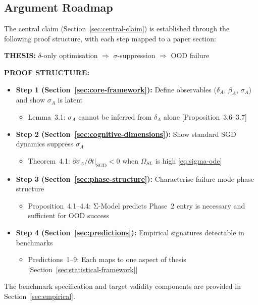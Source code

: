 \documentclass[10pt]{article}
\begin{document}
\subsection{Argument Roadmap}\label{sec:argument-roadmap}

The central claim (Section~\ref{sec:central-claim}) is established through the
following proof structure, with each step mapped to a paper section:

\textbf{THESIS:} $\delta$-only optimisation $\Rightarrow$ $\sigma$-suppression $\Rightarrow$ OOD failure

\textbf{PROOF STRUCTURE:}
\begin{itemize}[nosep]
\item \textbf{Step 1 (Section~\ref{sec:core-framework}):} Define observables ($\delta_A$, $\beta_A$, $\sigma_A$) and show $\sigma_A$ is latent
  \begin{itemize}[nosep]
  \item Lemma~3.1: $\sigma_A$ cannot be inferred from $\delta_A$ alone [Proposition~3.6--3.7] %
  \end{itemize}
\item \textbf{Step 2 (Section~\ref{sec:cognitive-dimensions}):} Show standard SGD dynamics suppress $\sigma_A$
  \begin{itemize}[nosep]
  \item Theorem~4.1: $\partial\sigma_A/\partial t|_{\text{SGD}} < 0$ when $\Omega_{SL}$ is high \eqref{eq:sigma-ode}
  \end{itemize}
\item \textbf{Step 3 (Section~\ref{sec:phase-structure}):} Characterise failure mode phase structure
  \begin{itemize}[nosep]
  \item Proposition~4.1--4.4: Σ-Model predicts Phase~2 entry is necessary and sufficient for OOD success
  \end{itemize}
\item \textbf{Step 4 (Section~\ref{sec:predictions}):} Empirical signatures detectable in benchmarks
  \begin{itemize}[nosep]
  \item Predictions~1--9: Each maps to one aspect of thesis [Section~\ref{sec:statistical-framework}]
  \end{itemize}
\end{itemize}

The benchmark specification and target validity
components are provided in Section~\ref{sec:empirical}.
\end{document}
